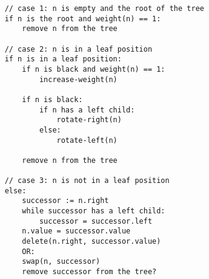 \documentclass{article}
\begin{document}
\begin{small}
\begin{verbatim}
    // case 1: n is empty and the root of the tree
    if n is the root and weight(n) == 1:
        remove n from the tree

    // case 2: n is in a leaf position
    if n is in a leaf position:
        if n is black and weight(n) == 1:
            increase-weight(n)

        if n is black:
            if n has a left child:
                rotate-right(n)
            else:
                rotate-left(n)

        remove n from the tree

    // case 3: n is not in a leaf position
    else:
        successor := n.right
        while successor has a left child:
            successor = successor.left
        n.value = successor.value
        delete(n.right, successor.value)
        OR:
        swap(n, successor)
        remove successor from the tree?
\end{verbatim}
\end{small}
\end{document}
